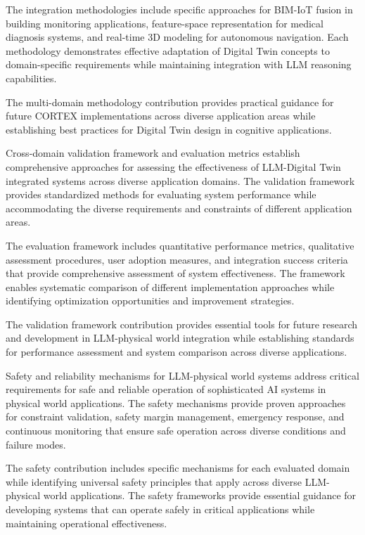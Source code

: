 The integration methodologies include specific approaches for BIM-IoT fusion in building monitoring applications, feature-space representation for medical diagnosis systems, and real-time 3D modeling for autonomous navigation. Each methodology demonstrates effective adaptation of Digital Twin concepts to domain-specific requirements while maintaining integration with LLM reasoning capabilities.

The multi-domain methodology contribution provides practical guidance for future CORTEX implementations across diverse application areas while establishing best practices for Digital Twin design in cognitive applications.

Cross-domain validation framework and evaluation metrics establish comprehensive approaches for assessing the effectiveness of LLM-Digital Twin integrated systems across diverse application domains. The validation framework provides standardized methods for evaluating system performance while accommodating the diverse requirements and constraints of different application areas.

The evaluation framework includes quantitative performance metrics, qualitative assessment procedures, user adoption measures, and integration success criteria that provide comprehensive assessment of system effectiveness. The framework enables systematic comparison of different implementation approaches while identifying optimization opportunities and improvement strategies.

The validation framework contribution provides essential tools for future research and development in LLM-physical world integration while establishing standards for performance assessment and system comparison across diverse applications.

Safety and reliability mechanisms for LLM-physical world systems address critical requirements for safe and reliable operation of sophisticated AI systems in physical world applications. The safety mechanisms provide proven approaches for constraint validation, safety margin management, emergency response, and continuous monitoring that ensure safe operation across diverse conditions and failure modes.

The safety contribution includes specific mechanisms for each evaluated domain while identifying universal safety principles that apply across diverse LLM-physical world applications. The safety frameworks provide essential guidance for developing systems that can operate safely in critical applications while maintaining operational effectiveness.

